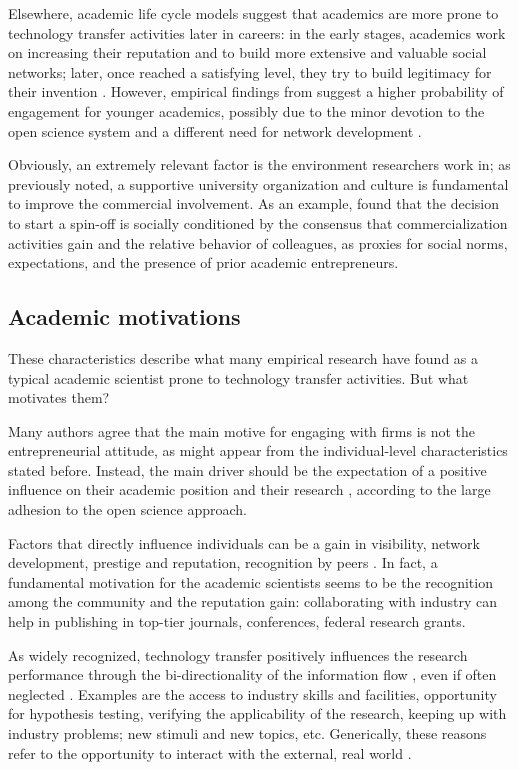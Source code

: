 Elsewhere, academic life cycle models suggest that academics are more prone to technology transfer activities later in careers: in the early stages, academics work on increasing their reputation and to build more extensive and valuable social networks; later, once reached a satisfying level, they try to build legitimacy for their invention \citet{Fini2009}. However, empirical findings from \citet{DEste2007} suggest a higher probability of engagement for younger academics, possibly due to the minor devotion to the open science system and a different need for network development \citep{Bercovitz2006}.

Obviously, an extremely relevant factor is the environment researchers work in; as previously noted, a supportive university organization and culture is fundamental to improve the commercial involvement. As an example, \citet{OShea2004} found that the decision to start a spin-off is socially conditioned by the consensus that commercialization activities gain and the relative behavior of colleagues, as proxies for social norms, expectations, and the presence of prior academic entrepreneurs. 

\subsection{Academic motivations}

These characteristics describe what many empirical research have found as a typical academic scientist prone to technology transfer activities. But what motivates them? 

Many authors agree that the main motive for engaging with firms is not the entrepreneurial attitude, as might appear from the individual-level characteristics stated before. Instead, the main driver should be the expectation of a positive influence on their academic position and their research \citep{Fini2009, DEste2011}, according to the large adhesion to the open science approach.

Factors that directly influence individuals can be a gain in visibility, network development, prestige and reputation, recognition by peers \citep{Baldini2007, Fini2009, Rizzo2015}. In fact, a fundamental motivation for the academic scientists seems to be the recognition among the community and the reputation gain: collaborating with industry can help in publishing in top-tier journals, conferences, federal research grants.

As widely recognized, technology transfer positively influences the research performance through the bi-directionality of the information flow \citep{Geuna2009}, even if often neglected \citep{DEste2007}. Examples are the access to industry skills and facilities, opportunity for hypothesis testing, verifying the applicability of the research, keeping up with industry problems; new stimuli and new topics, etc. Generically, these reasons refer to the opportunity to interact with the external, real world \citep{Baldini2007}. 

